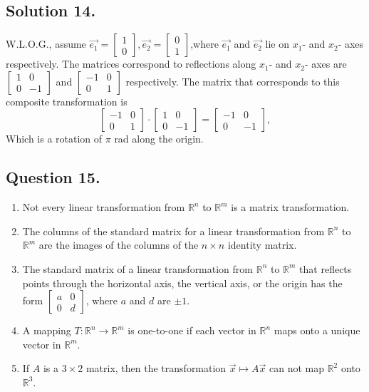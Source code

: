 \documentclass{article}
\begin{document}
\subsection*{Solution 14.}
W.L.O.G., assume $\Vec{e_1}=\left[\begin{array}{c}1\\0\end{array}\right],\Vec{e_2}=\left[\begin{array}{c}0\\1\end{array}\right]$,where $\vec{e_1}$ and $\vec{e_2}$ lie on $x_1$- and $x_2$- axes respectively.\newline
The matrices correspond to reflections along $x_1$- and $x_2$- axes are $\left[\begin{array}{cc}1&0\\0&-1\end{array}\right]$ and $\left[\begin{array}{cc}-1&0\\0&1\end{array}\right]$ respectively.
The matrix that corresponds to this composite transformation is
\[\left[\begin{array}{cc}-1&0\\0&1\end{array}\right]\cdot \left[\begin{array}{cc}1&0\\0&-1\end{array}\right]=\left[\begin{array}{cc}-1&0\\0&-1\end{array}\right],\]
Which is a rotation of $\pi$ rad along the origin.
\subsection*{Question 15.}
\begin{enumerate}
    \item Not every linear transformation from $\mathbb{R}^n$ to $\mathbb{R}^m$ is a matrix transformation.
    \item The columns of the standard matrix for a linear transformation from $\mathbb{R}^n$ to $\mathbb{R}^m$ are the images of the columns of the $n \times n$ identity matrix.
    \item The standard matrix of a linear transformation from $\mathbb{R}^n$ to $\mathbb{R}^m$ that reflects points through the horizontal axis, the vertical axis, or the origin has the form $\left[\begin{array}{cc}
        a & 0 \\
        0 & d
    \end{array}\right]$, where $a$ and $d$ are $\pm 1$.
    \item A mapping $T:\mathbb{R}^n \rightarrow \mathbb{R}^m$ is one-to-one if each vector in $\mathbb{R}^n$ maps onto a unique vector in $\mathbb{R}^m$.
    \item If $A$ is a $3 \times 2$ matrix, then the transformation $\Vec{x}\mapsto A\Vec{x}$ can not map $\mathbb{R}^2$ onto $\mathbb{R}^3$.
\end{enumerate}
\end{document}
